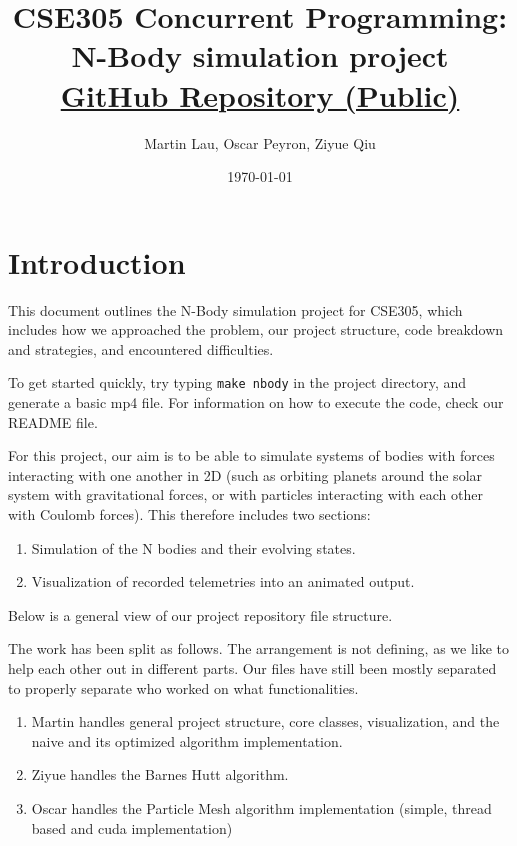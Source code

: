 \documentclass{article}
\title{CSE305 Concurrent Programming: N-Body simulation project\\[0.5em]
\href{https://github.com/thatmartinlau/ConcurrentProject}{\small{GitHub Repository (Public)}}}
\author{Martin Lau, Oscar Peyron, Ziyue Qiu}
\date{\today}
\begin{document}
\maketitle

\section{Introduction}
This document outlines the N-Body simulation project for CSE305, which includes how we approached the problem, our project structure, code breakdown and strategies, and encountered difficulties.

To get started quickly, try typing \texttt{make nbody} in the project directory, and generate a basic mp4 file.
For information on how to execute the code, check our README file.

For this project, our aim is to be able to simulate systems of bodies with forces interacting with one another in 2D (such as orbiting planets around the solar system with gravitational forces, or with particles interacting with each other with Coulomb forces). This therefore includes two sections:
\begin{enumerate}
    \item Simulation of the N bodies and their evolving states.
    \item Visualization of recorded telemetries into an animated output.
\end{enumerate}

Below is a general view of our project repository file structure. 

\begin{tcolorbox}[title=Project directory summary]
\end{tcolorbox}

The work has been split as follows. The arrangement is not defining, as we like to help each other out in different parts. Our files have still been mostly separated to properly separate who worked on what functionalities.
\begin{enumerate}
    \item Martin handles general project structure, core classes, visualization, and the naive and its optimized algorithm implementation.
    \item Ziyue handles the Barnes Hutt algorithm.
    \item Oscar handles the Particle Mesh algorithm implementation (simple, thread based and cuda implementation) %
\end{enumerate}
\end{document}
